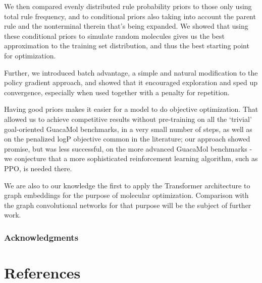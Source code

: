 \documentclass{article}
\begin{document}
We then compared evenly distributed rule probability priors to those only using total rule frequency, and to conditional priors also taking into account the parent rule and the nonterminal therein that's being expanded. We showed that using these conditional priors to simulate random molecules gives us the best approximation to the training set distribution, and thus the best starting point for optimization.

Further, we introduced batch advantage, a simple and natural modification to the policy gradient approach, and showed that it encouraged exploration and sped up convergence, especially when used together with a penalty for repetition.

Having good priors makes it easier for a model to do objective optimization. That allowed us to achieve competitive results without pre-training on all the `trivial' goal-oriented GuacaMol benchmarks, in a very small number of steps, as well as on the penalized logP objective common in the literature;  our approach showed promise, but was less successful, on the more advanced GuacaMol benchmarks - we conjecture that a more sophisticated reinforcement learning algorithm, such as PPO, is needed there.

We are also to our knowledge the first to apply the Transformer architecture to graph embeddings for the purpose of molecular optimization. Comparison with the graph convolutional networks for that purpose will be the subject of further work.


\subsubsection*{Acknowledgments}

\section*{References}
\medskip

\small
 

\end{document}

